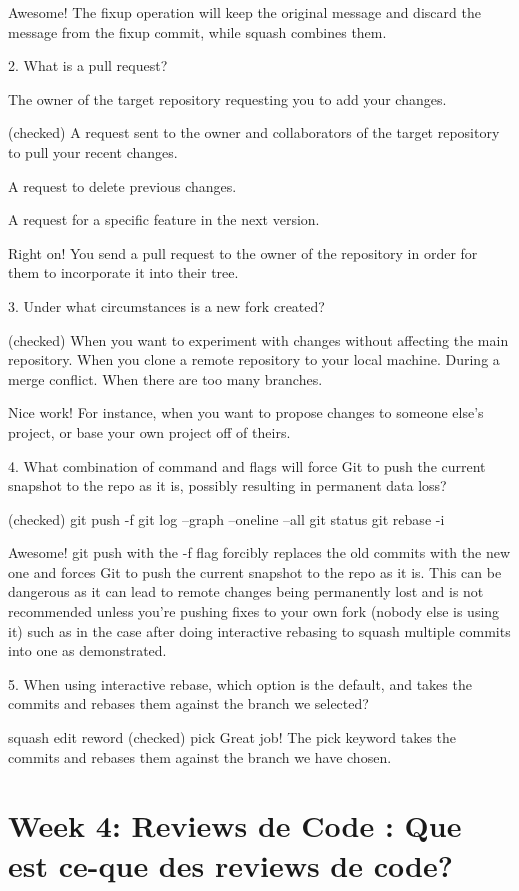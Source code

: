 \documentclass[11pt, onecolumn]{article}
\begin{document}
Awesome! The fixup operation will keep the original message and discard the message from the fixup commit, while squash combines them.


2. What is a pull request?

The owner of the target repository requesting you to add your changes.

(checked) A request sent to the owner and collaborators of the target repository to pull your recent changes.

A request to delete previous changes.

A request for a specific feature in the next version.

Right on! You send a pull request to the owner of the repository in order for them to incorporate it into their tree.


3. Under what circumstances is a new fork created?

(checked) When you want to experiment with changes without affecting the main repository.
When you clone a remote repository to your local machine.
During a merge conflict.
When there are too many branches.

Nice work! For instance, when you want to propose changes to someone else's project, or base your own project off of theirs.


4. What combination of command and flags will force Git to push the current snapshot to the repo as it is, possibly resulting in permanent data loss?

(checked) git push -f
git log --graph --oneline --all
git status 
git rebase -i

Awesome! git push with the -f flag forcibly replaces the old commits with the new one and forces Git to push the current snapshot to the repo as it is. This can be dangerous as it can lead to remote changes being permanently lost and is not recommended unless you're pushing fixes to your own fork (nobody else is using it) such as in the case after doing interactive rebasing to squash multiple commits into one as demonstrated.


5. When using interactive rebase, which option is the default, and takes the commits and rebases them against the branch we selected?

squash
edit
reword
(checked) pick
Great job! The pick keyword takes the commits and rebases them against the branch we have chosen.


\section{Week 4: Reviews de Code : Que est ce-que des reviews de code?}
\end{document}
